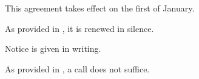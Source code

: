 \documentclass[12pt]{article}
\begin{document}
    \label{art:duration}
    \begin{paras}
        \item \label{par:start} This agreement takes effect on the first of January.
        \item As provided in , it is renewed in silence.
        \begin{paras}
            \item \label{pt:notice} Notice is given in writing.
            \item As provided in , a call does not suffice.
        \end{paras}
    \end{paras}
\end{document}
